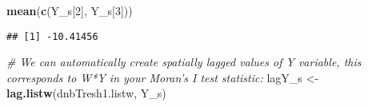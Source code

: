 \documentclass[
]{book}
\newenvironment{Shaded}{\begin{snugshade}}{\end{snugshade}}
\newcommand{\CommentTok}[1]{\textcolor[rgb]{0.56,0.35,0.01}{\textit{#1}}}
\newcommand{\DecValTok}[1]{\textcolor[rgb]{0.00,0.00,0.81}{#1}}
\newcommand{\KeywordTok}[1]{\textcolor[rgb]{0.13,0.29,0.53}{\textbf{#1}}}
\newcommand{\NormalTok}[1]{#1}
\newcommand{\StringTok}[1]{\textcolor[rgb]{0.31,0.60,0.02}{#1}}
\begin{document}
\begin{Shaded}
\begin{Highlighting}[]
\KeywordTok{mean}\NormalTok{(}\KeywordTok{c}\NormalTok{(Y_s[}\DecValTok{2}\NormalTok{], Y_s[}\DecValTok{3}\NormalTok{]))}
\end{Highlighting}
\end{Shaded}

\begin{verbatim}
## [1] -10.41456
\end{verbatim}

\begin{Shaded}
\begin{Highlighting}[]
\CommentTok{# We can automatically create spatially lagged values of Y variable, this corresponds to W*Y in your Moran's I test statistic:}
\NormalTok{lagY_s <-}\StringTok{ }\KeywordTok{lag.listw}\NormalTok{(dnbTresh1.listw, Y_s)}
\end{Highlighting}
\end{Shaded}
\end{document}
